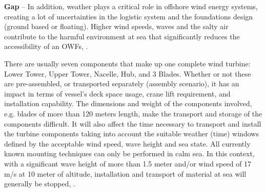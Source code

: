 \textbf{Gap} --
In addition, weather plays a critical role in offshore wind energy systems, creating a lot of uncertainties in the logistic system and the foundations design (ground based or floating). Higher wind speeds, waves and the salty air contribute to the harmful environment at sea that significantly reduces the accessibility of an OWFs, \cite{Smit2007}.

There are usually seven components that make up one complete wind turbine: Lower Tower, Upper Tower, Nacelle, Hub, and 3 Blades. Whether or not these are pre-assembled, or transported separately (assembly scenario), it has an impact in terms of vessel’s deck space usage, crane lift requirement, and installation capability. The dimensions and weight of the components involved, e.g. blades of more than 120 meters length, make the transport and storage of the components difficult. It will also affect the time necessary to transport and install the turbine components taking into account the suitable weather (time) windows defined by the acceptable wind speed, wave height and sea state. All currently known mounting techniques can only be performed in calm sea. In this context, with a significant wave height of more than 1.5 meter and/or wind speed of 17 m/s at 10 meter of altitude, installation and transport of material at sea will generally be stopped, \cite{aitsimulation}.
